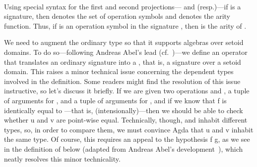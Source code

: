 \begin{center}

\AgdaSpace{}%
\AgdaSymbol{:}\AgdaSpace{}%
\AgdaSymbol{(}\AgdaSpace{}%
\AgdaSpace{}%
\AgdaSymbol{:}\AgdaSpace{}%
\AgdaSymbol{)}\AgdaSpace{}%
\AgdaSpace{}%
\AgdaSpace{}%
\AgdaSymbol{(}\AgdaSpace{}%
\AgdaSymbol{(}\AgdaSpace{}%
\AgdaSpace{}%
\AgdaSymbol{))}\\[4pt]
\AgdaSpace{}%
\AgdaSpace{}%
\AgdaSpace{}%
\AgdaSymbol{=}\AgdaSpace{}%
\AgdaFunction{Σ[}\AgdaSpace{}%
\AgdaSpace{}%
\AgdaSpace{}%
\AgdaSpace{}%
\AgdaSpace{}%
\AgdaFunction{]}\AgdaSpace{}%
\AgdaSymbol{(}\AgdaSpace{}%
\AgdaSpace{}%
\AgdaSpace{}%
\AgdaSymbol{)}

\end{center}

Using special syntax for the first and second
projections--- and
 (resp.)---if
 \as{:}    is a signature, then
   denotes the set of operation symbols and    denotes the arity function.
Thus, if  \as{:}    is an operation symbol in the
signature , then     is the arity of .

We need to augment the ordinary  type so that it supports algebras over
setoid domains.
\ifshort\else
To do so---following Andreas Abel's lead (cf.~\cite{Abel:2021})---we
define an operator that translates an ordinary signature into a ,
that is, a signature over a setoid domain.
\fi
This raises a minor technical issue concerning
the dependent types involved in the definition.
\ifshort\else
Some readers might find the resolution of
this issue instructive, so let's discuss it briefly.
\fi
If we are given two operations  and , a tuple  \as{:}     
 of arguments for , and a tuple  \as{:}  
    of arguments for , and if we know that \ab f is identically equal to
---that is,    (intensionally)---then we should be able to
check whether \ab u and \ab v are point-wise equal.  Technically, though,  and
 inhabit different types, so, in order to compare them, we must convince Agda
that \ab u and \ab v inhabit the same type. Of course, this requires an appeal to the
hypothesis \ab f  \ab g, as we see in the definition of  below (adapted
from Andreas Abel's development~\cite{Abel:2021}), which neatly resolves this minor
technicality.

